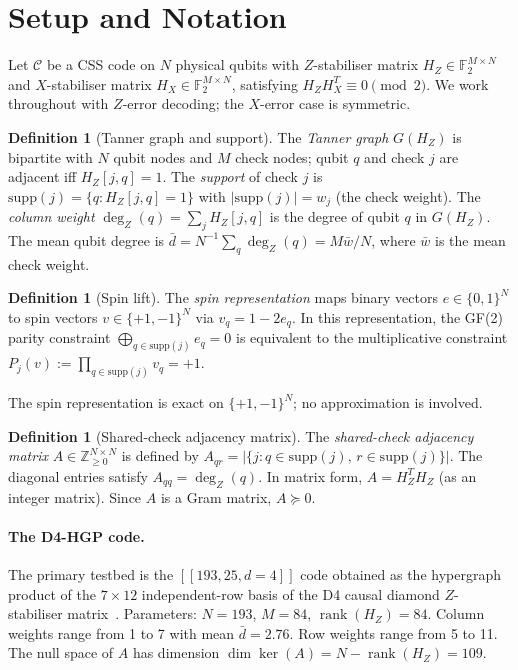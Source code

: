 \documentclass[12pt,a4paper]{article}
\theoremstyle{plain}
\theoremstyle{definition}
\newtheorem{definition}[theorem]{Definition}
\theoremstyle{remark}
\newcommand{\GFtwo}{\mathbb{F}_2}
\newcommand{\HZ}{H_Z}
\newcommand{\HX}{H_X}
\newcommand{\rank}{\operatorname{rank}}
\newcommand{\dZ}{\operatorname{deg}_Z}
\begin{document}
\section{Setup and Notation}\label{sec:setup}

Let $\mathcal{C}$ be a CSS code on $N$ physical qubits with
$Z$-stabiliser matrix $\HZ \in \GFtwo^{M \times N}$ and
$X$-stabiliser matrix $\HX \in \GFtwo^{M \times N}$,
satisfying $\HZ \HX^T \equiv 0 \pmod{2}$.
We work throughout with $Z$-error decoding; the $X$-error case is symmetric.

\begin{definition}[Tanner graph and support]\label{def:tanner}
The \emph{Tanner graph} $G(\HZ)$ is bipartite with $N$ qubit nodes and
$M$ check nodes; qubit $q$ and check $j$ are adjacent iff $\HZ[j,q]=1$.
The \emph{support} of check $j$ is $\mathrm{supp}(j) = \{q : \HZ[j,q]=1\}$
with $|\mathrm{supp}(j)| = w_j$ (the check weight).
The \emph{column weight} $\dZ(q) = \sum_j \HZ[j,q]$ is the degree of
qubit $q$ in $G(\HZ)$.
The mean qubit degree is $\bar{d} = N^{-1}\sum_q \dZ(q) = M\bar{w}/N$,
where $\bar{w}$ is the mean check weight.
\end{definition}

\begin{definition}[Spin lift]\label{def:lift}
The \emph{spin representation} maps binary vectors $e \in \{0,1\}^N$ to
spin vectors $v \in \{+1,-1\}^N$ via $v_q = 1 - 2e_q$.
In this representation, the GF(2) parity constraint
$\bigoplus_{q \in \mathrm{supp}(j)} e_q = 0$
is equivalent to the multiplicative constraint
$P_j(v) := \prod_{q \in \mathrm{supp}(j)} v_q = +1$.
\end{definition}

The spin representation is exact on $\{+1,-1\}^N$; no approximation is
involved.

\begin{definition}[Shared-check adjacency matrix]\label{def:adjacency}
The \emph{shared-check adjacency matrix} $A \in \mathbb{Z}_{\geq 0}^{N\times N}$
is defined by $A_{qr} = |\{j : q\in\mathrm{supp}(j),\, r\in\mathrm{supp}(j)\}|$.
The diagonal entries satisfy $A_{qq} = \dZ(q)$.
In matrix form, $A = \HZ^T \HZ$ (as an integer matrix).
Since $A$ is a Gram matrix, $A \succeq 0$.
\end{definition}

\paragraph{The D4-HGP code.}
The primary testbed is the $[[193,25,d=4]]$ code obtained as the
hypergraph product of the $7\times 12$ independent-row basis of the D4
causal diamond $Z$-stabiliser matrix~\cite{SchmittScale}.
Parameters: $N=193$, $M=84$, $\rank(\HZ)=84$.
Column weights range from 1 to 7 with mean $\bar{d}=2.76$.
Row weights range from 5 to 11.
The null space of $A$ has dimension $\dim\ker(A) = N - \rank(\HZ) = 109$.
\end{document}
